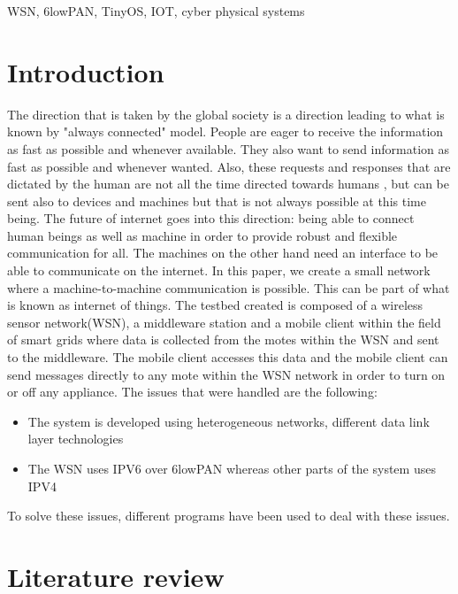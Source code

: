\documentclass[conference]{IEEEtran}
\begin{document}
\begin{IEEEkeywords}
WSN, 6lowPAN, TinyOS, IOT, cyber physical systems
\end{IEEEkeywords}

\section{Introduction}
The direction that is taken by the global society is a direction leading to what is known by "always connected" model. People are eager to receive the information as fast as possible and whenever available. They also want to send information as fast as possible and whenever wanted. Also, these requests and responses that are dictated by the human are not all the time directed towards humans , but can be sent also to devices and machines but that is not always possible at this time being. The future  of internet goes into this direction: being able to connect human beings as well as machine in order to provide robust and flexible communication for all. The machines on the other hand need an interface to be able to communicate on the internet. In this paper, we create a small network where a machine-to-machine communication is possible. This can be part of what is known as internet of things. The testbed created is composed of a wireless sensor network(WSN), a middleware station and a mobile client within the field of smart grids where data is collected from the motes within the WSN and sent to the middleware. The mobile client accesses this data and the mobile client can send messages directly to any mote within the WSN network in order to turn on or off any appliance. The issues that were handled are the following:
\begin{itemize}
\item The system is developed using heterogeneous networks, different data link layer technologies
\item The WSN uses IPV6 over 6lowPAN whereas other parts of the system uses IPV4
\end{itemize}
To solve these issues, different programs have been used to deal with these issues. 
 
\section{Literature review}
\end{document}
